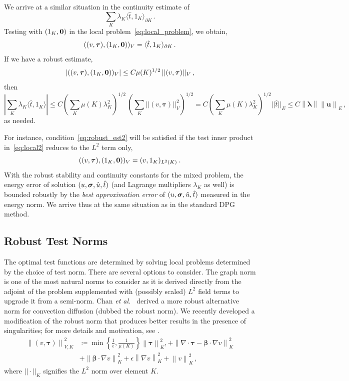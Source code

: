 \documentclass[letterpaper]{article}
\def\btau{\boldsymbol\tau}
\def\bftau{\boldsymbol\tau}
\def\bbeta{\boldsymbol\beta}
\newcommand{\norm}[1]{\left\| #1 \right\|}
\newcommand{\LRp}[1]{\left( #1 \right)}
\newcommand{\Grad} {\ensuremath{\nabla}}
\newcommand{\ptl}{{\partial}}
\newcommand{\bfsig}{\mbox{\boldmath $\sigma$}}
\newcommand{\bfu}{\boldsymbol u}
\newcommand{\bflambda}{\boldsymbol\lambda}
\def\etal{{\it et al.~}}
\newcommand{\grad}{\nabla}
\renewcommand{\div}{\grad \cdot}
\begin{document}
We arrive at a similar situation in the continuity estimate of
$$
\sum_K \lambda_K \langle \hat{t}, 1_K \rangle_{\partial K}\,.
$$
Testing with $(1_K,{\bf 0})$ in the local problem~\eqref{eq:local_problem}, we obtain,
\begin{equation}
((v,\bftau),(1_K,{\bf 0}))_V = \langle \hat{t}, 1_K \rangle_{\ptl K}\,.
\label{eq:local2}
\end{equation}
If we have a robust estimate,
\begin{equation}
| ((v,\bftau),(1_K,{\bf 0}))_V | \leq C \mu(K)^{1/2} \, || (v,\bftau) ||_V\,,
\label{eq:robust_est2}
\end{equation}
then
\begin{equation}
| \sum_K \lambda_K \langle \hat{t}, 1_K \rangle | \leq C (\sum_K \mu(K) \lambda_K^2)^{1/2}
\, (\sum_K || (v,\bftau) ||_V^2)^{1/2}
= C (\sum_K \mu(K) \lambda_K^2)^{1/2}  || \hat{t} ||_E
\leq C\norm{\bflambda}\norm{\bfu}_E
\,,
\end{equation}
as needed.

For instance, condition~\eqref{eq:robust_est2} will be satisfied if the test inner product
in~\eqref{eq:local2} reduces to the $L^2$ term only,
\begin{equation}
((v,\bftau),(1_K,{\bf 0}))_V = (v,1_K)_{L^2(K)} \: .
\end{equation}
With the robust stability and continuity constants for the mixed problem, the energy error
of solution $(u,\bfsig,\hat{u},\hat{t})$ (and Lagrange multipliers $\lambda_K$ as well)
is bounded robustly by the {\em best approximation error} of  $(u,\bfsig,\hat{u},\hat{t})$
measured in the energy norm. We arrive thus at the same situation as in the standard
DPG method.


\subsection{Robust Test Norms}
\label{sec:robustNorms}
The optimal test functions are determined by solving local problems determined
by the choice of test norm. There are several options to consider.
The graph norm \cite{DPGOverview2} is one of the most natural norms to consider
as it is derived directly from the adjoint of the problem supplemented with
(possibly scaled) $L^2$ field terms to upgrade it from a semi-norm.
Chan \etal\cite{ChanHeuerThanhDemkowicz2012} derived a more robust alternative
norm for convection diffusion (dubbed the robust norm). We recently
developed a modification of the robust norm that produces better
results in the presence of singularities; 
for more details and motivation, see \cite{JesseDissertation}.
\begin{align}
\norm{\LRp{v,\btau}}_{V,K}^2 &\coloneqq
\min\left\{\frac{1}{\epsilon},\frac{1}{\mu(K)}\right\}\norm{\btau}_K^2,
+ \norm{\div \btau - \bbeta\cdot\Grad v}_K^2 \nonumber\\
&+\norm{\bbeta\cdot \Grad v}_K^2
+ \epsilon\norm{\Grad v}_K^2
+ \norm{v}^2_K\,,
\end{align}
where $||\cdot||_K$ signifies the $L^2$ norm over element $K$.\
\end{document}
